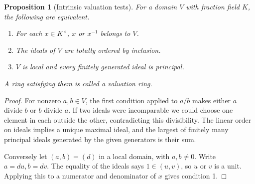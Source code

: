 \documentclass[11pt,oneside,openany]{book}
\newtheorem{proposition}[theorem]{Proposition}
\theoremstyle{definition}
\theoremstyle{remark}
\begin{document}
\begin{proposition}[Intrinsic valuation tests]\label{res:W01}
For a domain \(V\) with fraction field \(K\), the following are equivalent.
\begin{enumerate}
\item For each \(x\in K^\times\), \(x\) or \(x^{-1}\) belongs to \(V\).
\item The ideals of \(V\) are totally ordered by inclusion.
\item \(V\) is local and every finitely generated ideal is principal.
\end{enumerate}
A ring satisfying them is called a valuation ring.
\end{proposition}
\begin{proof}
For nonzero \(a,b\in V\), the first condition applied to \(a/b\) makes either \(a\) divide \(b\) or \(b\) divide \(a\). If two ideals were incomparable we could choose one element in each outside the other, contradicting this divisibility. The linear order on ideals implies a unique maximal ideal, and the largest of finitely many principal ideals generated by the given generators is their sum.

Conversely let \((a,b)=(d)\) in a local domain, with \(a,b\ne0\). Write \(a=du,b=dv\). The equality of the ideals says \(1\in(u,v)\), so \(u\) or \(v\) is a unit. Applying this to a numerator and denominator of \(x\) gives condition 1.
\end{proof}
\end{document}
